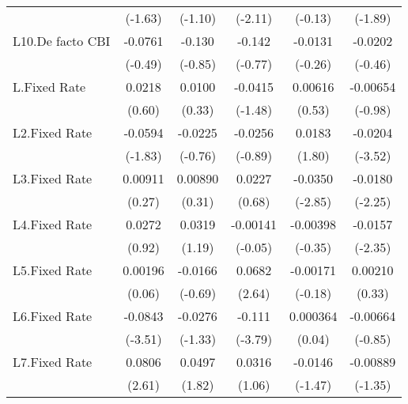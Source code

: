 {\begin{longtable}{l*{5}{c}}
                &  (-1.63)         &  (-1.10)         &  (-2.11)         &  (-0.13)         &  (-1.89)         \\
[1em]
L10.De facto CBI&  -0.0761         &   -0.130         &   -0.142         &  -0.0131         &  -0.0202         \\
                &  (-0.49)         &  (-0.85)         &  (-0.77)         &  (-0.26)         &  (-0.46)         \\
[1em]
L.Fixed Rate    &   0.0218         &   0.0100         &  -0.0415         &  0.00616         & -0.00654         \\
                &   (0.60)         &   (0.33)         &  (-1.48)         &   (0.53)         &  (-0.98)         \\
[1em]
L2.Fixed Rate   &  -0.0594         &  -0.0225         &  -0.0256         &   0.0183         &  -0.0204\sym{***}\\
                &  (-1.83)         &  (-0.76)         &  (-0.89)         &   (1.80)         &  (-3.52)         \\
[1em]
L3.Fixed Rate   &  0.00911         &  0.00890         &   0.0227         &  -0.0350\sym{**} &  -0.0180\sym{*}  \\
                &   (0.27)         &   (0.31)         &   (0.68)         &  (-2.85)         &  (-2.25)         \\
[1em]
L4.Fixed Rate   &   0.0272         &   0.0319         & -0.00141         & -0.00398         &  -0.0157\sym{*}  \\
                &   (0.92)         &   (1.19)         &  (-0.05)         &  (-0.35)         &  (-2.35)         \\
[1em]
L5.Fixed Rate   &  0.00196         &  -0.0166         &   0.0682\sym{**} & -0.00171         &  0.00210         \\
                &   (0.06)         &  (-0.69)         &   (2.64)         &  (-0.18)         &   (0.33)         \\
[1em]
L6.Fixed Rate   &  -0.0843\sym{***}&  -0.0276         &   -0.111\sym{***}& 0.000364         & -0.00664         \\
                &  (-3.51)         &  (-1.33)         &  (-3.79)         &   (0.04)         &  (-0.85)         \\
[1em]
L7.Fixed Rate   &   0.0806\sym{*}  &   0.0497         &   0.0316         &  -0.0146         & -0.00889         \\
                &   (2.61)         &   (1.82)         &   (1.06)         &  (-1.47)         &  (-1.35)         \\

\end{longtable}}

